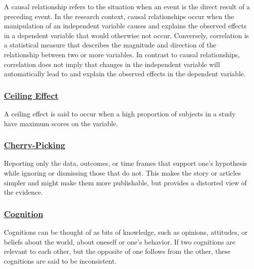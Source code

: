 \documentclass[
  letterpaper,
]{book}
\begin{document}
A causal relationship refers to the situation when an event is the
direct result of a preceding event. In the research context, causal
relationships occur when the manipulation of an independent variable
causes and explains the observed effects in a dependent variable that
would otherwise not occur. Conversely, correlation is a statistical
measure that describes the magnitude and direction of the relationship
between two or more variables. In contrast to causal relationships,
correlation does not imply that changes in the independent variable will
automatically lead to and explain the observed effects in the dependent
variable.

\subsubsection*{\texorpdfstring{\hyperref[def-ceilingeffect]{Ceiling
Effect}}{Ceiling Effect}}\label{ceiling-effect}

A ceiling effect is said to occur when a high proportion of subjects in
a study have maximum scores on the variable.

\subsubsection*{\texorpdfstring{\hyperref[def-cherry-picking]{Cherry-Picking}}{Cherry-Picking}}\label{cherry-picking}

Reporting only the data, outcomes, or time frames that support one's
hypothesis while ignoring or dismissing those that do not. This makes
the story or articles simpler and might make them more publishable, but
provides a distorted view of the evidence.

\subsubsection*{\texorpdfstring{\hyperref[def-cognition]{Cognition}}{Cognition}}\label{cognition}

Cognitions can be thought of as bits of knowledge, such as opinions,
attitudes, or beliefs about the world, about oneself or one's behavior.
If two cognitions are relevant to each other, but the opposite of one
follows from the other, these cognitions are said to be inconsistent.
\end{document}
